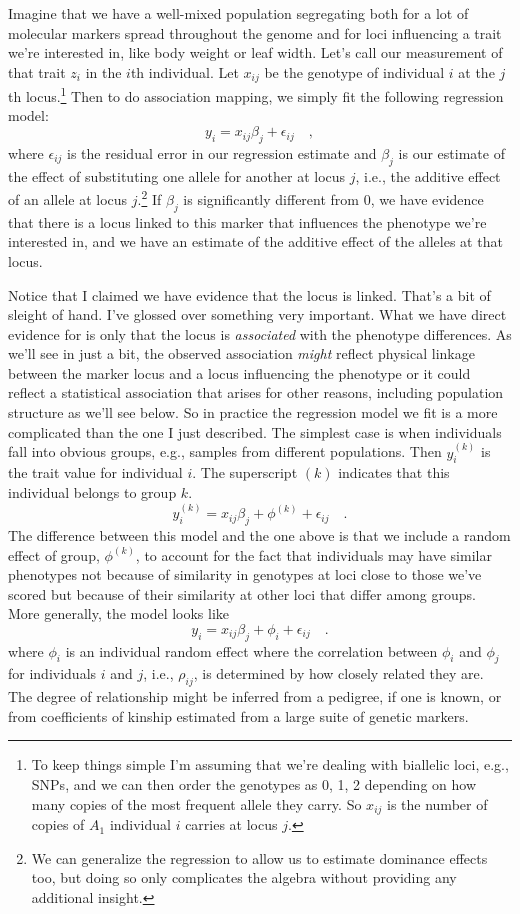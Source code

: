 Imagine that we have a well-mixed population segregating both for a
lot of molecular markers spread throughout the genome and for loci
influencing a trait we're interested in, like body weight or leaf
width. Let's call our measurement of that trait $z_i$ in the $i$th
individual. Let $x_{ij}$ be the genotype of individual $i$ at the
$j$th locus.\footnote{To keep things simple I'm assuming that we're
  dealing with biallelic loci, e.g., SNPs, and we can then order the
  genotypes as 0, 1, 2 depending on how many copies of the most
  frequent allele they carry. So $x_{ij}$ is the number of copies of
  $A_1$ individual $i$ carries at locus $j$.} Then to do association
mapping, we simply fit the following regression
model:
\[
y_i = x_{ij}\beta_j + \epsilon_{ij} \quad ,
\]
where $\epsilon_{ij}$ is the residual error in our regression estimate
and $\beta_j$ is our estimate of the effect of substituting one allele
for another at locus $j$, i.e., the additive effect of an allele at
locus $j$.\footnote{We can generalize the regression to allow us to
  estimate dominance effects too, but doing so only complicates the
  algebra without providing any additional insight.} If $\beta_j$ is
significantly different from 0, we have evidence that there is a locus
linked to this marker that influences the phenotype we're interested
in, and we have an estimate of the additive effect of the alleles at
that locus.

Notice that I claimed we have evidence that the locus is
linked. That's a bit of sleight of hand. I've glossed over something
very important. What we have direct evidence for is only that the
locus is {\it associated} with the phenotype differences. As we'll see
in just a bit, the observed association {\it might\/} reflect physical
linkage between the marker locus and a locus influencing the phenotype
or it could reflect a statistical association that arises for other
reasons, including population structure as we'll see below. So in
practice the regression model we fit is a more complicated than the
one I just described. The simplest case is when individuals fall into
obvious groups, e.g., samples from different populations. Then
$y_i^{(k)}$ is the trait value for individual $i$. The superscript
$(k)$ indicates that this individual belongs to group $k$.
\[
y_i^{(k)} = x_{ij}\beta_j + \phi^{(k)} + \epsilon_{ij} \quad .
\]
The difference between this model and the one above is that we include
a random effect of group, $\phi^{(k)}$, to account for the fact that
individuals may have similar phenotypes not because of similarity in
genotypes at loci close to those we've scored but because of their
similarity at other loci that differ among groups. More generally, the
model looks like
\[
y_i = x_{ij}\beta_j + \phi_i + \epsilon_{ij} \quad .
\]
where $\phi_i$ is an individual random effect where the correlation
between $\phi_i$ and $\phi_j$ for individuals $i$ and $j$, i.e.,
$\rho_{ij}$, is determined by how closely related they are. The degree
of relationship might be inferred from a pedigree, if one is known, or
from coefficients of kinship estimated from a large suite of genetic
markers. 

